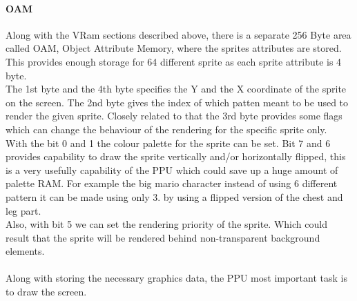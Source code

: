 \documentclass[]{report}
\begin{document}
\paragraph{OAM }
Along with the VRam sections described above, there is a separate 256 Byte area called OAM, Object Attribute Memory, where the sprites attributes are stored. This provides enough storage for 64 different sprite as each sprite attribute is 4 byte. 
\\
The 1st byte and the 4th byte specifies the Y and the X coordinate of the sprite on the screen. The 2nd byte gives the index of which patten meant to be used to render the given sprite. Closely related to that the 3rd byte provides some flags which can change the behaviour of the rendering for the specific sprite only. 
\\
With the bit 0 and 1 the colour palette for the sprite can be set. Bit 7 and 6 provides capability to draw the sprite vertically and/or horizontally flipped, this is a very usefully capability of the PPU which could save up a huge amount of palette RAM. For example the big mario character instead of using 6 different pattern it can be made using only 3. by using a flipped version of the chest and leg part.
\\
 Also, with bit 5 we can set the rendering priority of the sprite. Which could result that the sprite will be rendered behind non-transparent background elements.

\paragraph{ }
Along with storing the necessary graphics data, the PPU most important task is to draw the screen.
 
\end{document}
